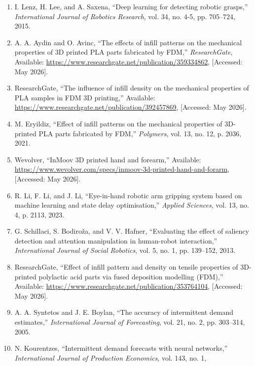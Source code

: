 \documentclass[12pt,a4paper,oneside]{report}
\begin{document}
\begin{enumerate}
  S. Kumra, S. Joshi, and F. Sahin, ``GR-ConvNet v2: A real-time
  multi-grasp detection network for robotic grasping,'' \emph{Sensors},
  vol. 22, no. 17, p. 6377, 2022.
\item
  I. Lenz, H. Lee, and A. Saxena, ``Deep learning for detecting robotic
  grasps,'' \emph{International Journal of Robotics Research}, vol. 34,
  no. 4-5, pp. 705--724, 2015.
\item
  A. A. Aydin and O. Avinc, ``The effects of infill patterns on the
  mechanical properties of 3D printed PLA parts fabricated by FDM,''
  \emph{ResearchGate}, Available:
  \url{https://www.researchgate.net/publication/359334862}, {[}Accessed:
  May 2026{]}.
\item
  ResearchGate, ``The influence of infill density on the mechanical
  properties of PLA samples in FDM 3D printing,'' Available:
  \url{https://www.researchgate.net/publication/392457869}, {[}Accessed:
  May 2026{]}.
\item
  M. Eryildiz, ``Effect of infill patterns on the mechanical properties
  of 3D-printed PLA parts fabricated by FDM,'' \emph{Polymers}, vol. 13,
  no. 12, p. 2036, 2021.
\item
  Wevolver, ``InMoov 3D printed hand and forearm,'' Available:
  \url{https://www.wevolver.com/specs/inmoov-3d-printed-hand-and-forarm},
  {[}Accessed: May 2026{]}.
\item
  R. Li, F. Li, and J. Li, ``Eye-in-hand robotic arm gripping system
  based on machine learning and state delay optimisation,''
  \emph{Applied Sciences}, vol. 13, no. 4, p. 2113, 2023.
\item
  G. Schillaci, S. Bodiro\v{z}a, and V. V. Hafner, ``Evaluating the effect
  of saliency detection and attention manipulation in human-robot
  interaction,'' \emph{International Journal of Social Robotics}, vol.
  5, no. 1, pp. 139--152, 2013.
\item
  ResearchGate, ``Effect of infill pattern and density on tensile
  properties of 3D-printed polylactic acid parts via fused deposition
  modelling (FDM),'' Available:
  \url{https://www.researchgate.net/publication/353764104}, {[}Accessed:
  May 2026{]}.
\item
  A. A. Syntetos and J. E. Boylan, ``The accuracy of intermittent demand
  estimates,'' \emph{International Journal of Forecasting}, vol. 21, no.
  2, pp. 303--314, 2005.
\item
  N. Kourentzes, ``Intermittent demand forecasts with neural networks,''
  \emph{International Journal of Production Economics}, vol. 143, no. 1,

\end{enumerate}
\end{document}
